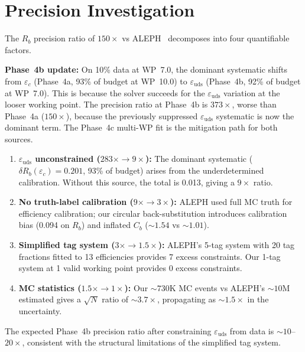 \documentclass[11pt,a4paper]{article}
\begin{document}
\section{Precision Investigation}
\label{sec:precision_investigation}

The $R_b$ precision ratio of $150\times$ vs ALEPH~\cite{ALEPH:Rb:1996} decomposes
into four quantifiable factors.

\textbf{Phase~4b update:} On 10\% data at WP~7.0, the dominant systematic shifts from
$\varepsilon_c$ (Phase~4a, 93\% of budget at WP~10.0) to $\varepsilon_\mathrm{uds}$
(Phase~4b, 92\% of budget at WP~7.0). This is because the solver succeeds for the
$\varepsilon_\mathrm{uds}$ variation at the looser working point. The precision ratio
at Phase~4b is $373\times$, worse than Phase~4a ($150\times$), because the previously
suppressed $\varepsilon_\mathrm{uds}$ systematic is now the dominant term. The Phase~4c
multi-WP fit is the mitigation path for both sources.

\begin{enumerate}
\item \textbf{$\varepsilon_\mathrm{uds}$ unconstrained ($283\times \to 9\times$):}
The dominant systematic ($\delta R_b(\varepsilon_c) = 0.201$, 93\% of budget) arises from the
underdetermined calibration. Without this source, the total is 0.013, giving a
$9\times$ ratio.

\item \textbf{No truth-label calibration ($9\times \to 3\times$):} ALEPH used full
MC truth for efficiency calibration; our circular back-substitution introduces
calibration bias (0.094 on $R_b$) and inflated $C_b$ ($\sim 1.54$ vs $\sim 1.01$).

\item \textbf{Simplified tag system ($3\times \to 1.5\times$):} ALEPH's 5-tag system
with 20 tag fractions fitted to 13 efficiencies provides 7 excess constraints. Our
1-tag system at 1 valid working point provides 0 excess constraints.

\item \textbf{MC statistics ($1.5\times \to 1\times$):} Our $\sim 730$K MC events vs
ALEPH's $\sim 10$M estimated gives a $\sqrt{N}$ ratio of $\sim 3.7\times$,
propagating as $\sim 1.5\times$ in the uncertainty.
\end{enumerate}

The expected Phase~4b precision ratio after constraining $\varepsilon_\mathrm{uds}$
from data is $\sim 10$--$20\times$, consistent with the structural limitations
of the simplified tag system.
\end{document}
